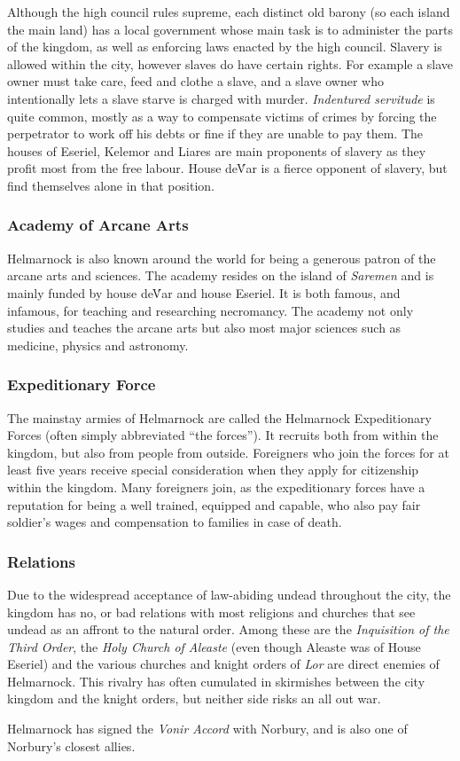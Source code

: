 Although the high council rules supreme, each distinct old barony (so each
island the main land) has a local government whose main task is to administer
the parts of the kingdom, as well as enforcing laws enacted by the high council.
Slavery is allowed within the city, however slaves do have certain rights. For
example a slave owner must take care, feed and clothe a slave, and a slave
owner who intentionally lets a slave starve is charged with murder.
\emph{Indentured servitude} is quite common, mostly as a way to compensate
victims of crimes by forcing the perpetrator to work off his debts or fine if
they are unable to pay them. The houses of Eseriel, Kelemor and Liares are main
proponents of slavery as they profit most from the free labour. House de\'Var
is a fierce opponent of slavery, but find themselves alone in that position.

\subsubsection{Academy of Arcane Arts}

Helmarnock is also known around the world for being a generous patron of the
arcane arts and sciences. The academy resides on the island of \emph{Saremen}
and is mainly funded by house de\'Var and house Eseriel. It is both famous,
and infamous, for teaching and researching necromancy. The academy not only
studies and teaches the arcane arts but also most major sciences such as
medicine, physics and astronomy.

\subsubsection{Expeditionary Force}

The mainstay armies of Helmarnock are called the Helmarnock Expeditionary
Forces (often simply abbreviated ``the forces''). It recruits both from
within the kingdom, but also from people from outside. Foreigners who join the
forces for at least five years receive special consideration when they apply for
citizenship within the kingdom. Many foreigners join, as the expeditionary
forces have a reputation for being a well trained, equipped and capable, who
also pay fair soldier's wages and compensation to families in case of death.

\subsubsection{Relations}

Due to the widespread acceptance of law-abiding undead throughout the city, the
kingdom has no, or bad relations with most religions and churches that see
undead as an affront to the natural order. Among these are the
\emph{Inquisition of the Third Order}, the \emph{Holy Church of Aleaste} (even
though Aleaste was of House Eseriel) and the various churches and knight
orders of \emph{Lor} are direct enemies of Helmarnock. This rivalry has often
cumulated in skirmishes between the city kingdom and the knight orders, but
neither side risks an all out war.

Helmarnock has signed the \emph{Vonir Accord} with Norbury, and is also one
of Norbury's closest allies.
